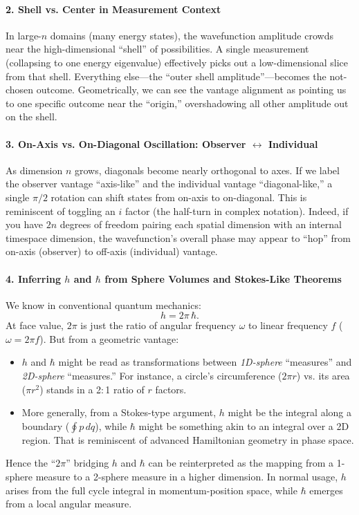 \documentclass{article}
\begin{document}
\paragraph{2. Shell vs. Center in Measurement Context}
In large-$n$ domains (many energy states), the wavefunction amplitude crowds near the high-dimensional “shell” of possibilities. A single measurement (collapsing to one energy eigenvalue) effectively picks out a low-dimensional slice from that shell. Everything else---the “outer shell amplitude”---becomes the not-chosen outcome. Geometrically, we can see the vantage alignment as pointing us to one specific outcome near the “origin,” overshadowing all other amplitude out on the shell.

\paragraph{3. On-Axis vs. On-Diagonal Oscillation: Observer $\leftrightarrow$ Individual}
As dimension $n$ grows, diagonals become nearly orthogonal to axes. If we label the observer vantage “axis-like” and the individual vantage “diagonal-like,” a single $\pi/2$ rotation can shift states from on-axis to on-diagonal. This is reminiscent of toggling an $i$ factor (the half-turn in complex notation). Indeed, if you have $2n$ degrees of freedom pairing each spatial dimension with an internal timespace dimension, the wavefunction’s overall phase may appear to “hop” from on-axis (observer) to off-axis (individual) vantage.

\paragraph{4. Inferring $h$ and $\hbar$ from Sphere Volumes and Stokes-Like Theorems}
We know in conventional quantum mechanics:
\begin{equation}
h = 2\pi\,\hbar.\end{equation}
At face value, $2\pi$ is just the ratio of angular frequency $\omega$ to linear frequency $f$ ($\omega=2\pi f$). But from a geometric vantage:
\begin{itemize}
\item $h$ and $\hbar$ might be read as transformations between \emph{1D-sphere} “measures” and \emph{2D-sphere} “measures.” For instance, a circle’s circumference ($2\pi r$) vs. its area ($\pi r^2$) stands in a 2$:$1 ratio of $r$ factors.\vspace{-4pt}
\item More generally, from a Stokes-type argument, $h$ might be the integral along a boundary (\(\oint p\,dq\)), while $\hbar$ might be something akin to an integral over a 2D region. That is reminiscent of advanced Hamiltonian geometry in phase space.
\end{itemize}
Hence the “$2\pi$” bridging $h$ and $\hbar$ can be reinterpreted as the mapping from a 1-sphere measure to a 2-sphere measure in a higher dimension. In normal usage, $h$ arises from the full cycle integral in momentum-position space, while $\hbar$ emerges from a local angular measure.
\end{document}
